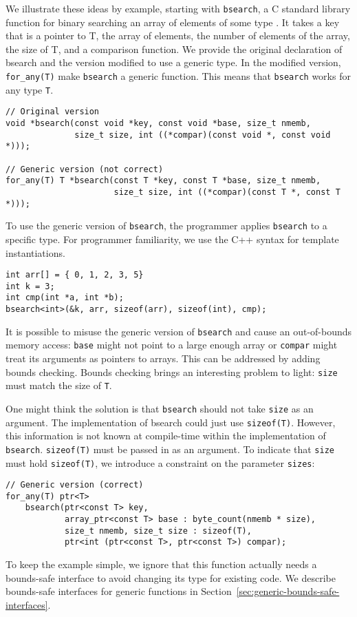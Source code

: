 We illustrate these ideas by example, starting with \lstinline+bsearch+, 
a C standard library function for binary
searching an array of elements of some type .  It
takes a key that is a pointer to T, the array of elements, the number of elements of
the array, the size of T, and a comparison function.  We provide the original declaration
of bsearch and the version modified to use a generic type.  In the modified version,
\lstinline+for_any(T)+ make \lstinline+bsearch+ a generic function.  This means that
\lstinline+bsearch+ works for any type \lstinline+T+.
\begin{lstlisting}
// Original version
void *bsearch(const void *key, const void *base, size_t nmemb, 
              size_t size, int ((*compar)(const void *, const void *)));

// Generic version (not correct)
for_any(T) T *bsearch(const T *key, const T *base, size_t nmemb,
                      size_t size, int ((*compar)(const T *, const T *)));
\end{lstlisting}
To use the generic version of \lstinline+bsearch+, the programmer applies \lstinline+bsearch+ to
a specific type.  For programmer familiarity, we use the C++ syntax for template
instantiations.
\begin{lstlisting}
int arr[] = { 0, 1, 2, 3, 5}
int k = 3;
int cmp(int *a, int *b);
bsearch<int>(&k, arr, sizeof(arr), sizeof(int), cmp);
\end{lstlisting}

It is possible to misuse the generic version of \lstinline+bsearch+ and cause
an out-of-bounds memory access: \lstinline+base+ might not point to a
large enough array or \lstinline+compar+ might treat its arguments as pointers to arrays.
This can be addressed by adding bounds checking.  Bounds checking brings
an interesting problem to light: \lstinline+size+  must match the size of \lstinline+T+.

One might think the solution is that \lstinline+bsearch+ should not take 
\lstinline+size+ as an argument.  The implementation of bsearch could just 
use \lstinline+sizeof(T)+. However, this information is not known at compile-time
within the implementation of \lstinline+bsearch+.   \lstinline+sizeof(T)+
must be passed in as an argument.  To indicate that \lstinline+size+ must
hold \lstinline+sizeof(T)+, we introduce a constraint on the parameter \lstinline+sizes+:
\begin{lstlisting}
// Generic version (correct)
for_any(T) ptr<T> 
    bsearch(ptr<const T> key,
            array_ptr<const T> base : byte_count(nmemb * size),
            size_t nmemb, size_t size : sizeof(T),
            ptr<int (ptr<const T>, ptr<const T>) compar);
\end{lstlisting}
To keep the example simple, we ignore that this function actually needs a 
bounds-safe interface to avoid changing its type for existing code.  
We describe  bounds-safe interfaces for generic
functions in Section~\ref{sec:generic-bounds-safe-interfaces}.

